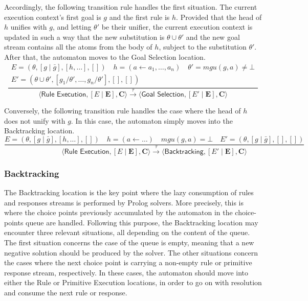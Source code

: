\documentclass{article}
\newcommand{\stateStyle}[1]{\textsf{#1}}
\newcommand{\state}[1]{\stateStyle{#1}}
\newcommand{\stream}[1]{\bar{#1}}
\newcommand{\vect}[1]{\mathbf{#1}}
\newcommand{\f}[1]{\mathit{#1}}
\newcommand{\fx}[2]{\f{#1}(#2)}
\newcommand{\transition}[1]{\xrightarrow{\ #1\ }}
\newcommand{\apply}[2]{#1 / #2}
\begin{document}
Accordingly, the following transition rule handles the first situation.
%
The current execution context's first goal is $g$ and the first rule is $h$. 
%
Provided that the head of $h$ unifies with $g$, and letting $\theta'$ be their unifier, the current execution context is updated in such a way that the new substitution is $\theta \cup \theta'$ and the new goal stream contains all the atoms from the body of $h$, subject to the substitution $\theta'$.
%
After that, the automaton moves to the \state{Goal Selection} location.
\[
    \frac{
        \begin{array}{c}
            E = (\theta, [g \mid \stream{g}], [h, \ldots], [])
            \quad
            h = (a \leftarrow a_1, \ldots, a_n)
            \quad
            \theta' = \fx{mgu}{g, a} \neq \bot
            \\
            E' = (\theta \cup \theta', [\apply{g_1}{\theta'}, \ldots, \apply{g_n}{\theta'}], [], [])
        \end{array}
    }{
        \langle \state{Rule Execution}, [E \mid \vect{E}], \vect{C} \rangle
        \transition{\tau}
        \langle \state{Goal Selection}, [E' \mid \vect{E}], \vect{C} \rangle
    }
\]

Conversely, the following transition rule handles the case where the head of $h$ does not unify with $g$.
%
In this case, the automaton simply moves into the \state{Backtracking} location.
%
\[
    \frac{
        E = (\theta, [g \mid \stream{g}], [h, \ldots], [])
        \quad
        h = (a \leftarrow \ldots)
        \quad
        \fx{mgu}{g, a} = \bot
        \quad
        E' = (\theta, [g \mid \stream{g}], [], [])
    }{
        \langle \state{Rule Execution}, [E \mid \vect{E}], \vect{C} \rangle
        \transition{\tau}
        \langle \state{Backtracking}, [E' \mid \vect{E}], \vect{C} \rangle
    }
\]

\subsubsection{Backtracking}

The \state{Backtracking} location is the key point where the lazy consumption of rules and responses streams is performed by Prolog solvers.
%
More precisely, this is where the choice points previously accumulated by the automaton in the choice-points queue are handled.
%
Following this purpose, the \state{Backtracking} location may encounter three relevant situations, all depending on the content of the queue.
%
The first situation concerns the case of the queue is empty, meaning that a new negative solution should be produced by the solver.
%
The other situations concern the cases where the next choice point is carrying a non-empty rule or primitive response stream, respectively.
%
In these cases, the automaton should move into either the \state{Rule} or \state{Primitive Execution} locations, in order to go on with resolution and consume the next rule or response.
\end{document}
